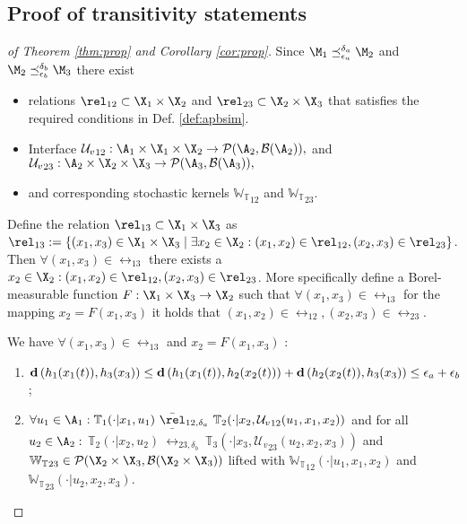 \documentclass[letterpaper, 10 pt, conference]{amsart}
\theoremstyle{definition}
\theoremstyle{example}
\theoremstyle{remark}
\newcommand{\InF}{\mathcal{U}_{v}}
\newcommand{\Wt}{\mathbb{W}_{\mathbb{T}}}
\begin{document}
\subsection{Proof of transitivity statements}
\begin{proof}[of Theorem \ref{thm:prop} and Corollary \ref{cor:prop}]
 Since $\M_1\preceq^{\delta_a}_{\epsilon_a}\M_2$ and  $\M_2\preceq^{\delta_b}_{\epsilon_b}\M_3$
there exist
\begin{itemize}
\item relations $\rel_{12}\subset \X_1\times \X_2$ and $\rel_{23}\subset\X_2 \times \X_3$ that satisfies the required conditions in Def. \ref{def:apbsim}.
\item Interface ${\InF}_{12}: \A_1\times \X_1\times\X_2 \rightarrow \mathcal{P}(\A_2,\mathcal B(\A_2)),$ and  ${\InF}_{23}: \A_2\times \X_2\times\X_3 \rightarrow \mathcal{P}(\A_3,\mathcal B(\A_3)),$
\item and corresponding stochastic kernels ${\Wt}_{12}$ and ${\Wt}_{23}$.\end{itemize}

Define the relation $\rel_{13}\subset \X_1\times\X_3$ as $\rel_{13}:=\{(x_1,x_3)\in\X_1\times\X_3\mid\exists x_2\in\X_2 :(x_1,x_2)\in\rel_{12}, (x_2,x_3)\in\rel_{23}\}$. 
Then 
$\forall (x_1,x_3)\in \rel_{13}$ there exists a $ x_2 \in \X_2 :(x_1,x_2)\in\rel_{12}, (x_2,x_3)\in\rel_{23}$.
More specifically define a Borel-measurable function $F:\X_1\times\X_3\rightarrow\X_2$ such that $\forall (x_1,x_3)\in \rel_{13}$ for the mapping $x_2=F(x_1,x_3)$ it holds that $(x_1,x_2)\in\rel_{12}, (x_2,x_3)\in\rel_{23}$.

We have $\forall (x_1,x_3)\in\rel_{13}$ and  $x_2=F(x_1,x_3)$ :
\begin{enumerate}
\item $\cramped{\mathbf{d}\left(h_1(x_1(t)),h_3(x_3)\right)\leq \mathbf{d}\left(h_1(x_1(t)),h_2(x_2(t))\right)+\mathbf{d}\left(h_2(x_2(t)),h_3(x_3)\right)\leq \epsilon_a+\epsilon_b}$;
\item \(\cramped{\forall u_1\in\A_1:
\mathbb T_1(\cdot| x_1, u_1)\ \bar \rel_{12,\delta_a} \  \mathbb T_2(\cdot| x_2, {\InF}_{12}(u_1,x_1,x_2))}\)
and for all $u_2\in\A_2:$ 
\(\mathbb T_2(\cdot| x_2, u_2)\ \bar \rel_{23,\delta_b} \  \mathbb T_3(\cdot| x_3, {\InF}_{23}(u_2,x_2,x_3))\) 
and 
${\Wt}_{23}\in\mathcal{P}(\X_2\times\X_3,\mathcal{B}(\X_2\times\X_3))$ lifted with ${\Wt}_{12}(\cdot| u_1,x_1,x_2)$ and ${\Wt}_{23}(\cdot| u_2,x_2,x_3)$. 
\end{enumerate}


\end{proof}
\end{document}
